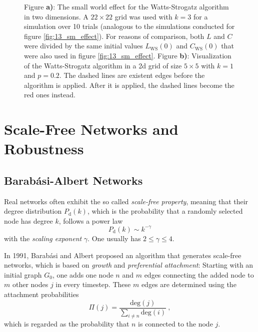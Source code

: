 \documentclass{scrartcl}
\begin{document}
\begin{figure}
    
    \caption{Figure \textbf{a)}: The small world effect for the
        Watts-Strogatz algorithm in two dimensions. A $22\times22$ grid was used with $k=3$
        for a simulation over 10 trials (analogous to the simulations
        conducted for figure \ref{fig:13_sm_effect}). For reasons of
        comparison, both $L$ and $C$ were divided by the same initial values
        $L_\mathrm{WS}(0)$ and
        $C_\mathrm{WS}(0)$ that were also used in figure
        \ref{fig:13_sm_effect}. Figure \textbf{b)}: Visualization of the
        Watts-Strogatz algorithm in a 2d grid of size $5\times 5$ with $k = 1$ and $p = 0.2$. The
        dashed lines are existent edges before the algorithm is applied. After it is
        applied, the dashed lines become the red ones instead.}
    \label{fig:15_sm_2d}
\end{figure}

\clearpage
\section{Scale-Free Networks and Robustness}
\subsection{Barab\'asi-Albert Networks}
Real networks often exhibit the so called \emph{scale-free property},
meaning that their degree distribution $P_\mathrm{d}(k)$, which is the probability
that a randomly selected node has degree $k$, follows a power law
\begin{equation}
    P_\mathrm{d}(k) \sim k^{-\gamma}
\end{equation}
with the \emph{scaling exponent} $\gamma$. One usually has $2 \le \gamma \le 4$.

In 1991, Barab\'asi and Albert proposed an algorithm that generates
scale-free networks, which is based on \emph{growth} and \emph{preferential
attachment}: Starting with an initial graph $G_0$, one adds one node $n$ and
$m$ edges connecting the added node to $m$ other nodes $j$ in every timestep.
These $m$ edges are determined using the attachment probabilities
\begin{equation}
    \Pi(j) = \frac{\mathrm{deg}(j)}{\sum_{i\neq n} \mathrm{deg}(i)}~,
\end{equation}
which is regarded as the probability that $n$ is connected to the node $j$.
\end{document}
